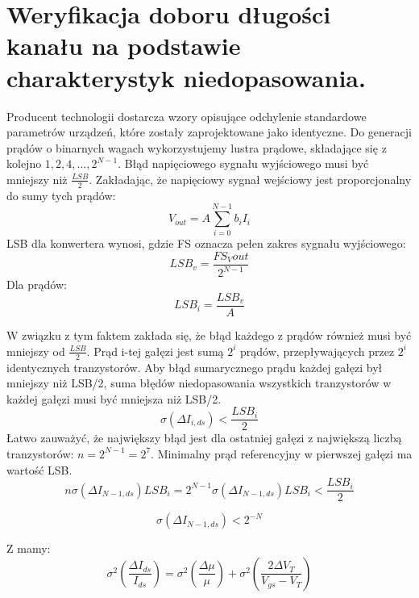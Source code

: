 \documentclass[10pt,a4paper]{report}
\theoremstyle{definition}
\theoremstyle{definition}
\theoremstyle{definition}
\theoremstyle{definition}
\theoremstyle{definition}
\begin{document}
	\chapter{Weryfikacja doboru długości kanału na podstawie charakterystyk niedopasowania.}
	{	Producent technologii dostarcza wzory opisujące odchylenie standardowe parametrów urządzeń, które zostały zaprojektowane jako identyczne. Do generacji prądów o binarnych wagach wykorzystujemy lustra prądowe, składające się z kolejno $1, 2, 4,..., 2^{N-1}$. Błąd napięciowego sygnału wyjściowego musi być mniejszy niż $\frac{LSB}{2}$. Zakładając, że napięciowy sygnał wejściowy jest proporcjonalny do sumy tych prądów:
		\begin{equation}
		V_{out} = A \sum_{i=0}^{N-1} b_{i}I_{i}
		\end{equation}
		LSB dla konwertera wynosi, gdzie FS oznacza pełen zakres sygnału wyjściowego:
		\begin{equation}
		LSB_v = \frac{FS_Vout}{2^{N-1}}
		\end{equation}
		Dla prądów:
		\begin{equation}
		LSB_i = \frac{LSB_v}{A}
		\end{equation}
		
		W związku z tym faktem zakłada się, że błąd każdego z prądów również musi być mniejszy od $\frac{LSB}{2}$. Prąd i-tej gałęzi jest sumą $2^{i}$ prądów, przepływających przez $2^{i}$ identycznych tranzystorów. Aby błąd sumarycznego prądu każdej gałęzi był mniejszy niż LSB/2, suma błędów niedopasowania wszystkich tranzystorów w każdej gałęzi musi być mniejsza niż LSB/2. 
		\begin{equation}
		\sigma \left( \Delta I_{i,ds} \right) < \frac{LSB_i}{2}
		\end{equation}
		Łatwo zauważyć, że największy błąd jest dla ostatniej gałęzi z największą liczbą tranzystorów: $n=2^{N-1}=2^7$. Minimalny prąd referencyjny w pierwszej gałęzi ma wartość LSB.
		\begin{equation}
		n \sigma \left( \Delta I_{N-1,ds} \right) LSB_i = 2^{N-1} \sigma \left( \Delta I_{N-1,ds} \right) LSB_i < \frac{LSB_i}{2}
		\end{equation}
		
		\begin{equation}
		\sigma \left( \Delta I_{N-1,ds} \right) < 2^{-N}
		\end{equation}
		
		Z \cite{ams_match_params} mamy:
		\begin{equation}
		\sigma^2 \left( \frac{\Delta I_{ds}}{I_{ds}}\right) = 	\sigma^2 \left( \frac{\Delta \mu}{\mu}\right) + \sigma^2 \left( \frac{2\Delta V_T}{V_{gs} - V_{T}}\right)
		\end{equation}
		
}
\end{document}
